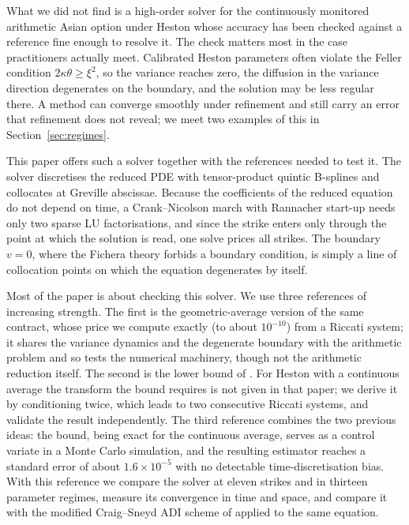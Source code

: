 What we did not find is a high-order solver for the continuously monitored arithmetic Asian option under
Heston whose accuracy has been checked against a reference fine enough to resolve it. The check matters
most in the case practitioners actually meet. Calibrated Heston parameters often violate the Feller
condition $2\kappa\theta\ge\xi^2$, so the variance reaches zero, the diffusion in the variance direction
degenerates on the boundary, and the solution may be less regular there. A method can converge smoothly
under refinement and still carry an error that refinement does not reveal; we meet two examples of this in
Section~\ref{sec:regimes}.

This paper offers such a solver together with the references needed to test it. The solver discretises
the reduced PDE with tensor-product quintic B-splines and collocates at Greville abscissae. Because the
coefficients of the reduced equation do not depend on time, a Crank--Nicolson march with Rannacher
start-up \citep{Rannacher1984} needs only two sparse LU factorisations, and since the strike enters only
through the point at which the solution is read, one solve prices all strikes. The boundary $v=0$, where
the Fichera theory forbids a boundary condition, is simply a line of collocation points on which the
equation degenerates by itself.

Most of the paper is about checking this solver. We use three references of increasing strength. The
first is the geometric-average version of the same contract, whose price we compute exactly (to about
$10^{-10}$) from a Riccati system; it shares the variance dynamics and the degenerate boundary with the
arithmetic problem and so tests the numerical machinery, though not the arithmetic reduction itself. The
second is the lower bound of \citet{FusaiKyriakou2016}. For Heston with a continuous average the transform
the bound requires is not given in that paper; we derive it by conditioning twice, which leads to two
consecutive Riccati systems, and validate the result independently. The third reference combines the two
previous ideas: the bound, being exact for the continuous average, serves as a control variate in a Monte
Carlo simulation, and the resulting estimator reaches a standard error of about $1.6\times10^{-5}$ with
no detectable time-discretisation bias. With this reference we compare the solver at eleven strikes and in
thirteen parameter regimes, measure its convergence in time and space, and compare it with the modified
Craig--Sneyd ADI scheme of \citet{inthoutFoulon2010} applied to the same equation.

